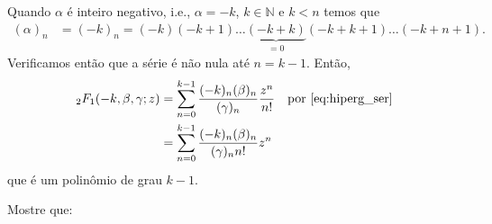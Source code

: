 \documentclass[a4paper,12pt, leqno, answers]{exam}
\begin{document}
\begin{questions}
\begin{solution}
        Quando $\alpha$ \'{e} inteiro negativo, i.e., $\alpha = -k$, $k \in \mathbb{N}$ e $k < n$ temos que
        \begin{align*}
            (\alpha)_n &= (-k)_n = (-k) (-k + 1) \ldots \underbrace{(-k + k)}_{= 0} (-k + k + 1) \ldots (-k + n + 1).
        \end{align*}
        Verificamos ent\~{a}o que a s\'{e}rie \'{e} n\~{a}o nula at\'{e} $n = k - 1$. Ent\~{a}o,
        \begin{align*}
            {}_2F_1(-k, \beta, \gamma; z) &= \sum_{n = 0}^{k - 1} \frac{(-k)_n (\beta)_n}{(\gamma)_n} \frac{z^n}{n!} && \text{por \eqref{eq:hiperg_ser}} \\
            &= \sum_{n = 0}^{k - 1} \frac{(-k)_n (\beta)_n}{(\gamma)_n n!} z^n 
        \end{align*}
        que \'{e} um polinômio de grau $k - 1$.
    \end{solution}

     Mostre que:
\end{questions}
\end{document}
